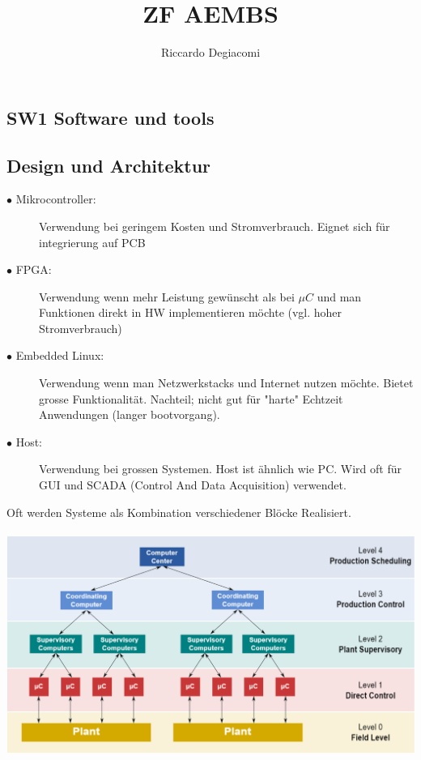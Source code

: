 \documentclass[a4paper, 8pt]{extarticle}
\title{ZF AEMBS}
\author{Riccardo Degiacomi}
\begin{document}
\begin{multicols*}{3}
	\section{SW1 Software und tools}
		\subsection{Design und Architektur}
			\begin{description}
				
				\item[$\bullet$ Mikrocontroller:] Verwendung bei geringem Kosten und Stromverbrauch. Eignet sich für integrierung auf PCB
				\item[$\bullet$ FPGA:] Verwendung wenn mehr Leistung gewünscht als bei $\mu C$ und man Funktionen direkt in HW implementieren möchte (vgl. hoher Stromverbrauch)
				\item[$\bullet$ Embedded Linux:] Verwendung wenn man Netzwerkstacks und Internet nutzen möchte. Bietet grosse Funktionalität. Nachteil; nicht gut für "harte" Echtzeit Anwendungen (langer bootvorgang).
				\item[$\bullet$ Host:] Verwendung bei grossen Systemen. Host ist ähnlich wie PC. Wird oft für GUI und SCADA (Control And Data Acquisition) verwendet.
				
			\end{description}
	Oft werden Systeme als Kombination verschiedener Blöcke Realisiert.\\
	\\
	\includegraphics[width=1\linewidth, left]{img/Hardware_Hierarchie}

\end{multicols*}
\end{document}
